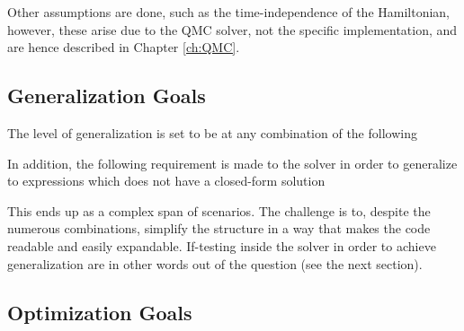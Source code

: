 Other assumptions are done, such as the time-independence of the Hamiltonian, however, these arise due to the QMC solver, not the specific implementation, and are hence described in Chapter \ref{ch:QMC}.

\subsection{Generalization Goals}
\label{sec:genGoals}

The level of generalization is set to be at any combination of the following

 
In addition, the following requirement is made to the solver in order to generalize to expressions which does not have a closed-form solution



This ends up as a complex span of scenarios. The challenge is to, despite the numerous combinations, simplify the structure in a way that makes the code readable and easily expandable. If-testing inside the solver in order to achieve generalization are in other words out of the question (see the next section).

\subsection{Optimization Goals}
\label{sec:optGoals}

